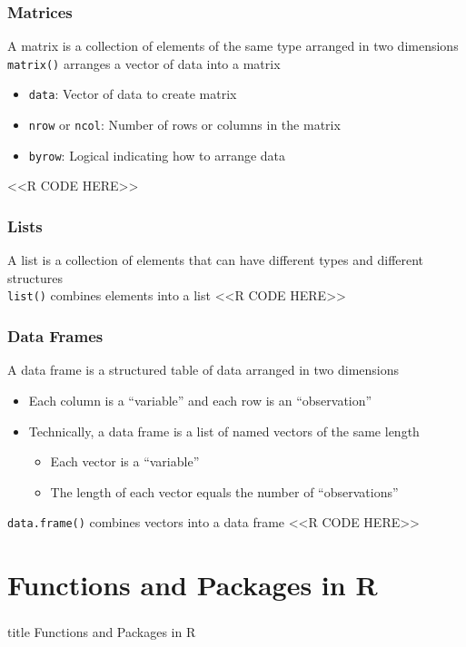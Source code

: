 \documentclass{beamer}
\begin{document}
\begin{frame}[fragile]\frametitle{Matrices}
    A matrix is a collection of elements of the same type arranged in two dimensions \\
    \vspace{3ex}
    \texttt{matrix()} arranges a vector of data into a matrix
    \begin{itemize}
        \item \texttt{data}: Vector of data to create matrix
        \item \texttt{nrow} or \texttt{ncol}: Number of rows or columns in the matrix
        \item \texttt{byrow}: Logical indicating how to arrange data
    \end{itemize}
    <<R CODE HERE>>
\end{frame}

\begin{frame}[fragile]\frametitle{Lists}
    A list is a collection of elements that can have different types and different structures \\
    \vspace{3ex}
    \texttt{list()} combines elements into a list
    <<R CODE HERE>>
\end{frame}

\begin{frame}[fragile]\frametitle{Data Frames}
    A data frame is a structured table of data arranged in two dimensions
    \begin{itemize}
        \item Each column is a ``variable'' and each row is an ``observation''
        \item Technically, a data frame is a list of named vectors of the same length
        \begin{itemize}
            \item Each vector is a ``variable''
            \item The length of each vector equals the number of ``observations''
        \end{itemize}
    \end{itemize}
    \vspace{3ex}
    \texttt{data.frame()} combines vectors into a data frame
    <<R CODE HERE>>
\end{frame}

\section{Functions and Packages in R}
\label{functions}
\begin{frame}\frametitle{}
    \vfill
    \centering
    \begin{beamercolorbox}[center]{title}
        \Large Functions and Packages in R
    \end{beamercolorbox}
    \vfill
\end{frame}
\end{document}
